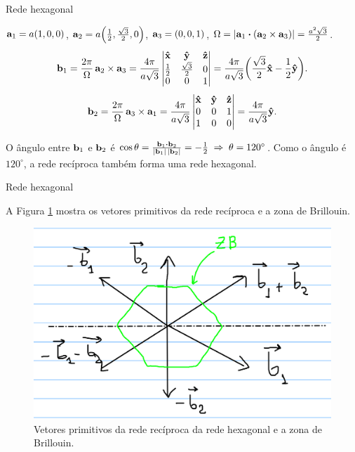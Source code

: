\documentclass[aspectratio=169]{beamer}
\begin{document}


\begin{frame}{Rede hexagonal}

$\vb{a}_1 = a(1,0,0)$, $\vb{a}_2 = a\qty(\frac{1}{2},\frac{\sqrt{3}}{2},0)$, $\vb{a}_3 = (0,0,1)$, $\Omega = \abs{\a_1 \vdot (\a_2 \times \a_3)} = \frac{a^2 \sqrt{3}}{2}$.
$$
\vb{b}_1 = \frac{2\pi}{\Omega} \, \vb{a}_2 \times \vb{a}_3 =
\frac{4\pi}{a \sqrt{3}}
\begin{vmatrix}
\vu{x} & \vu{y} & \vu{z} \\
\frac{1}{2} & \frac{\sqrt{3}}{2} & 0 \\
0 & 0 & 1 \\
\end{vmatrix}
=
\frac{4\pi}{a \sqrt{3}} \qty(\frac{\sqrt{3}}{2} \vu{x} - \frac{1}{2} \vu{y}).
$$
$$
\vb{b}_2 = \frac{2\pi}{\Omega} \, \vb{a}_3 \times \vb{a}_1 =
\frac{4\pi}{a \sqrt{3}}
\begin{vmatrix}
\vu{x} & \vu{y} & \vu{z} \\
0 & 0 & 1 \\
1 & 0 & 0 \\
\end{vmatrix}
= \frac{4\pi}{a\sqrt{3}} \vu{y}.
$$

O ângulo entre $\vb{b}_1$ e $\vb{b}_2$ é $\cos\theta = \frac{\b_1 \vdot \b_2}{\abs{\b_1}\,\abs{\b_2}} = -\frac{1}{2} \implies \theta = 120^\circ$. Como o ângulo é $120^\circ$, a rede recíproca também forma uma rede hexagonal.

\end{frame}




\begin{frame}{Rede hexagonal}

A Figura \ref{fig:hex_bz} mostra os vetores primitivos da rede recíproca e a zona de Brillouin.

\begin{figure}[H]
\centering
\includegraphics[width=0.65\linewidth]{fig/hex_bz}
\caption{Vetores primitivos da rede recíproca da rede hexagonal e a zona de Brillouin.}
\label{fig:hex_bz}
\end{figure}

\end{frame}
\end{document}
